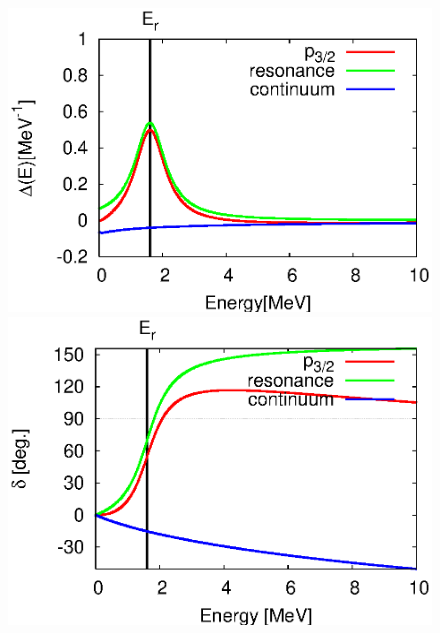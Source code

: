 \documentclass[english,a4paper]{jsarticle}
\begin{document}
\begin{figure}
  \begin{minipage}{0.5\textwidth}
    \begin{flushright}
      \includegraphics[width=1.0\textwidth,clip]{../cld/decompose/deco_cld_p3.eps}
    \end{flushright}
  \end{minipage}
  \begin{minipage}{0.5\textwidth}
    \begin{flushright}
      \includegraphics[width=1.0\textwidth,clip]{../phs/decompose/deco_phs_p3.eps}
    \end{flushright}
  \end{minipage}
\end{figure}
\end{document}
